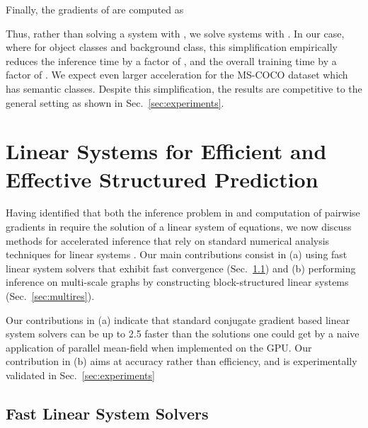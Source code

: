 \documentclass[runningheads]{llncs}
\newcommand{\refsec}[1]{Sec.~{\ref{#1}}}
\begin{document}
Finally, the gradients of  are computed as 

Thus, rather than solving a system with , we solve  systems with . In our case, where  for  object classes and  background class, 
this simplification empirically reduces the inference time by a factor of , and the overall training time by a factor of .
We expect even larger acceleration for the MS-COCO dataset which has  semantic classes. 
Despite this simplification, the results are competitive to the general setting as shown in Sec.~\ref{sec:experiments}.
 \section{Linear Systems for Efficient and Effective Structured Prediction}
\label{sec:optimization}
Having identified that both the inference problem in  and computation of pairwise gradients in  require the
solution of a linear system of equations, we 
now discuss  methods for accelerated inference that rely on standard numerical analysis techniques for linear systems  \cite{PressTVF92,Golub96}. 
Our  main contributions consist in (a) using fast linear system solvers that exhibit 
 fast convergence (\refsec{sec:solvers})  and (b) performing inference on multi-scale graphs by constructing block-structured linear systems (\refsec{sec:multires}).
 
 Our contributions in (a) indicate that standard conjugate gradient based linear system solvers can be up to 2.5 faster than the solutions one could get by a 
 naive application of parallel mean-field when implemented on the GPU. Our contribution in (b)  aims at accuracy rather than efficiency, and is experimentally validated in \refsec{sec:experiments}
 
 
\subsection{Fast Linear System Solvers}
\label{sec:solvers}
\end{document}
